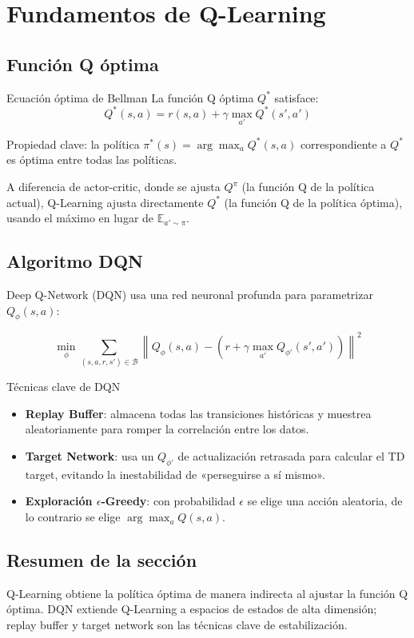 \section{Fundamentos de Q-Learning}

\subsection{Función Q óptima}

\begin{importantbox}{Ecuación óptima de Bellman}
La función Q óptima $Q^*$ satisface:
$$Q^*(s, a) = r(s, a) + \gamma \max_{a'} Q^*(s', a')$$

Propiedad clave: la política $\pi^*(s) = \arg\max_a Q^*(s, a)$ correspondiente a $Q^*$ es óptima entre todas las políticas.
\end{importantbox}

A diferencia de actor-critic, donde se ajusta $Q^\pi$ (la función Q de la política actual), Q-Learning ajusta directamente $Q^*$ (la función Q de la política óptima), usando el máximo en lugar de $\mathbb{E}_{a' \sim \pi}$.

\subsection{Algoritmo DQN}

Deep Q-Network (DQN) usa una red neuronal profunda para parametrizar $Q_\phi(s, a)$:

$$\min_\phi \sum_{(s,a,r,s') \in \mathcal{B}} \left\| Q_\phi(s, a) - \left(r + \gamma \max_{a'} Q_{\phi'}(s', a')\right) \right\|^2$$

\begin{importantbox}{Técnicas clave de DQN}
\begin{itemize}
    \item \textbf{Replay Buffer}: almacena todas las transiciones históricas y muestrea aleatoriamente para romper la correlación entre los datos.
    \item \textbf{Target Network}: usa un $Q_{\phi'}$ de actualización retrasada para calcular el TD target, evitando la inestabilidad de «perseguirse a sí mismo».
    \item \textbf{Exploración $\epsilon$-Greedy}: con probabilidad $\epsilon$ se elige una acción aleatoria, de lo contrario se elige $\arg\max_a Q(s,a)$.
\end{itemize}
\end{importantbox}

\subsection{Resumen de la sección}
 
Q-Learning obtiene la política óptima de manera indirecta al ajustar la función Q óptima. DQN extiende Q-Learning a espacios de estados de alta dimensión; replay buffer y target network son las técnicas clave de estabilización.

